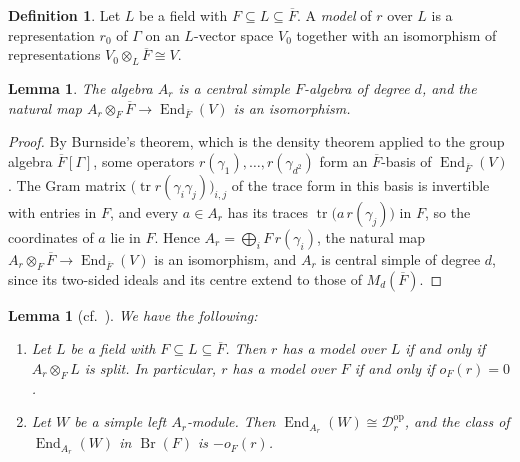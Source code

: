 \documentclass[a4paper,11pt]{amsart}
\newtheorem{lemma}[theorem]{Lemma}
\theoremstyle{definition}
\newtheorem{definition}[theorem]{Definition}
\theoremstyle{remark}
\numberwithin{equation}{section}
\DeclareMathOperator{\Br}{Br}
\DeclareMathOperator{\End}{End}
\DeclareMathOperator{\tr}{tr}
\newcommand{\op}{\mathrm{op}}
\begin{document}
\begin{definition}\label{def:model-span}
Let $L$ be a field with $F\subseteq L\subseteq\overline F$. A \emph{model} of $r$ over $L$ is a representation $r_0$ of $\Gamma$ on an $L$-vector space $V_0$ together with an isomorphism of representations $V_0\otimes_L\overline F\cong V$.
\end{definition}

\begin{lemma}\label{lem:trace-span}
The algebra $A_r$ is a central simple $F$-algebra of degree $d$, and the natural map $A_r\otimes_F\overline F\to\End_{\overline F}(V)$ is an isomorphism.
\end{lemma}

\begin{proof}
By Burnside's theorem, which is the density theorem \cite[Theorem~2.5(i)]{EGH11} applied to the group algebra $\overline F[\Gamma]$, some operators $r(\gamma_1),\dots,r(\gamma_{d^2})$ form an $\overline F$-basis of $\End_{\overline F}(V)$. The Gram matrix $\bigl(\tr r(\gamma_i\gamma_j)\bigr)_{i,j}$ of the trace form in this basis is invertible with entries in $F$, and every $a\in A_r$ has its traces $\tr\bigl(a\,r(\gamma_j)\bigr)$ in $F$, so the coordinates of $a$ lie in $F$. Hence $A_r=\bigoplus_i F\,r(\gamma_i)$, the natural map $A_r\otimes_F\overline F\to\End_{\overline F}(V)$ is an isomorphism, and $A_r$ is central simple of degree $d$, since its two-sided ideals and its centre extend to those of $M_d(\overline F)$.
\end{proof}

\begin{lemma}[cf.~{\cite[Lemma~3.0.7]{Su23}}]\label{lem:models}
We have the following: 
\begin{enumerate}
\item[(i)] Let $L$ be a field with $F\subseteq L\subseteq\overline F$. Then $r$ has a model over $L$ if and only if $A_r\otimes_FL$ is split. In particular, $r$ has a model over $F$ if and only if $o_F(r)=0$.
\item[(ii)] Let $W$ be a simple left $A_r$-module. Then $\End_{A_r}(W)\cong\mathcal D_r^{\op}$, and the class of $\End_{A_r}(W)$ in $\Br(F)$ is $-o_F(r)$.
\end{enumerate}
\end{lemma}
\end{document}
